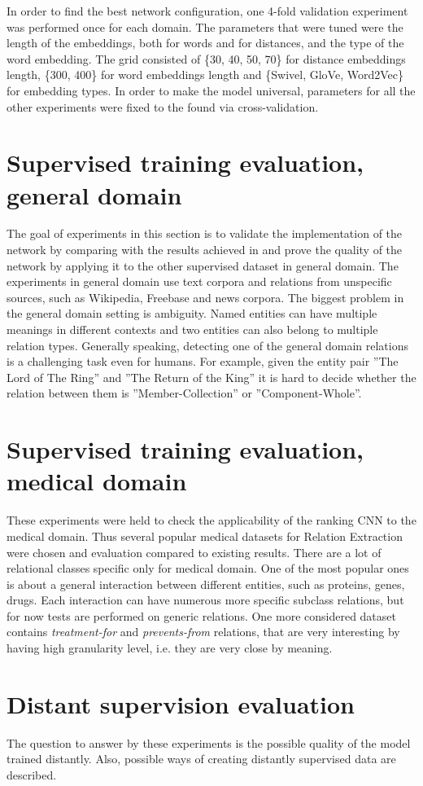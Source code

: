 In order to find the best network configuration, one 4-fold validation experiment was performed once for each domain. The parameters that were 
tuned were the length of the embeddings, both for words and for distances, and the type of the 
word embedding. The grid consisted of \{30, 40, 50, 70\} for distance embeddings length, \{300, 400\} for word embeddings length and \{Swivel, GloVe, Word2Vec\} for embedding types. In order to make the model universal, parameters for all the other experiments were fixed to the found via cross-validation.

\section{Supervised training evaluation, general domain}
The goal of experiments in this section is to validate the implementation of the network by 
comparing with the results achieved in \cite{DBLP:journals/corr/SantosXZ15} and prove the quality 
of the network by applying it to the other supervised dataset in general domain. 
The experiments in general domain use text corpora and relations from unspecific sources, such as 
Wikipedia, Freebase and news corpora. The biggest problem in the general domain setting is ambiguity. Named entities can have multiple meanings in different contexts and two entities can also belong to multiple relation types. Generally speaking, detecting one of the general domain relations is a 
challenging task even for humans. For example, given the entity pair ''The Lord of The Ring'' and 
''The Return of the King'' it is hard to decide whether the relation between them is 
''Member-Collection'' or ''Component-Whole''.


\section{Supervised training evaluation, medical domain}
These experiments were held to check the applicability of the ranking CNN to the medical 
domain. Thus several popular medical datasets for Relation Extraction were chosen and 
evaluation compared to existing results.
There are a lot of relational classes specific only for medical domain. One of the most popular ones 
is about a general interaction between different entities, such as proteins, genes, drugs. Each 
interaction can have numerous more specific subclass relations, but for now tests are performed 
on generic relations. One more considered dataset contains \textit{treatment-for} and 
\textit{prevents-from} relations, that are very interesting by having high granularity level, i.e. 
they are very close by meaning.


\section{Distant supervision evaluation}
The question to answer by these experiments is the possible quality of the model trained 
distantly. Also, possible ways of creating distantly supervised data are described.



